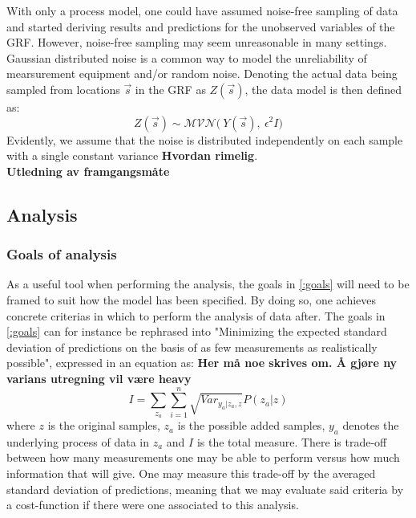 \documentclass{article}
\begin{document}
With only a process model, one could have assumed noise-free sampling of data and started deriving results and predictions for the unobserved variables of the GRF. However, noise-free sampling may seem unreasonable in many settings. Gaussian distributed noise is a common way to model the unreliability of mearsurement equipment and/or random noise. Denoting the actual data being sampled from locations $\vec{s}$ in the GRF as $Z(\vec{s})$, the data model is then defined as:
\begin{equation}
Z(\vec{s}) \sim \mathcal{MVN} \big( \ Y(\vec{s}), \ \epsilon^2 I \big)
\end{equation}
Evidently, we assume that the noise is distributed independently on each sample with a single constant variance \textbf{Hvordan rimelig}. \\ 


\textbf{Utledning av framgangsmåte} \\
\subsection{Analysis}
\subsubsection{Goals of analysis}
As a useful tool when performing the analysis, the goals in \ref{:goals} will need to be framed to suit how the model has been specified. By doing so, one achieves concrete criterias in which to perform the analysis of data after. The goals in \ref{:goals} can for instance be rephrased into "Minimizing the expected standard deviation of predictions on the basis of as few measurements as realistically possible", expressed in an equation as:
\textbf{Her må noe skrives om. Å gjøre ny varians utregning vil være heavy}
\begin{equation}
I = \sum_{z_a} \sum_{i=1}^n \sqrt{ Var_{y_a | z_a, z} } P(z_a | z) 
\end{equation}
where $z$ is the original samples, $z_a$ is the possible added samples, $y_a$ denotes the underlying process of data in $z_a$ and $I$ is the total measure. There is trade-off between how many measurements one may be able to perform versus how much information that will give. One may measure this trade-off by the averaged standard deviation of predictions, meaning that we may evaluate said criteria by a cost-function if there were one associated to this analysis. 
\end{document}
